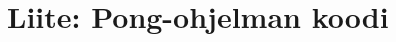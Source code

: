 \appendix
\section{Liite: Pong-ohjelman koodi}
\label{app:pong}
\inputminted[fontsize=\footnotesize]{eb}{pong.eb}